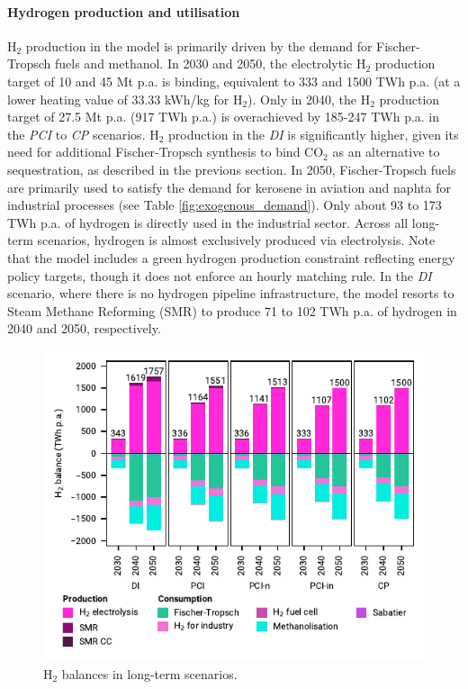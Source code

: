 \documentclass[pdflatex,sn-nature]{sn-jnl}%
\theoremstyle{thmstyleone}%
\theoremstyle{thmstyletwo}%
\theoremstyle{thmstylethree}%
\begin{document}
\paragraph{Hydrogen production and utilisation}
H$_2$ production in the model is primarily driven by the demand for Fischer-Tropsch fuels and methanol. In 2030 and 2050, the electrolytic H$_2$ production target of 10 and 45 Mt p.a. is binding, equivalent to 333 and 1500 TWh p.a. (at a lower heating value of 33.33 kWh/kg for H$_2$). Only in 2040, the H$_2$ production target of 27.5 Mt p.a. (917 TWh p.a.) is overachieved by 185-247 TWh p.a. in the \textit{PCI} to \textit{CP} scenarios. H$_2$ production in the \textit{DI} is significantly higher, given its need for additional Fischer-Tropsch synthesis to bind CO$_2$ as an alternative to sequestration, as described in the previous section.
In 2050, Fischer-Tropsch fuels are primarily used to satisfy the demand for kerosene in aviation and naphta for industrial processes (see Table \ref{fig:exogenous_demand}). Only about 93 to 173 TWh p.a. of hydrogen is directly used in the industrial sector. Across all long-term scenarios, hydrogen is almost exclusively produced via electrolysis. Note that the model includes a green hydrogen production constraint reflecting energy policy targets, though it does not enforce an hourly matching rule.
In the \textit{DI} scenario, where there is no hydrogen pipeline infrastructure, the model resorts to Steam Methane Reforming (SMR) to produce 71 to 102 TWh p.a. of hydrogen in 2040 and 2050, respectively.

\begin{figure}[htbp]
  \centering
  \includegraphics{figures/balances_overview_H2}
  \caption{H$_2$ balances in long-term scenarios.}
  \label{fig:balances_overview_H2}
\end{figure}
\end{document}
